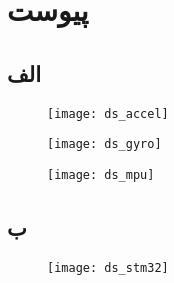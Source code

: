 \chapter*{‌پیوست}
\section*{الف} \label{apendix:mpu}
\begin{figure}[h!]
	\centering
	\texttt{[image: ds\_accel]}
\end{figure}
\begin{figure}[h!]
	\centering
	\texttt{[image: ds\_gyro]}
\end{figure}
\begin{figure}[h!]
	\centering
	\texttt{[image: ds\_mpu]}
\end{figure}

\newpage
\section*{ب} \label{apendix:stm32}
\begin{figure}[h]
	\centering
	\texttt{[image: ds\_stm32]}
\end{figure}
